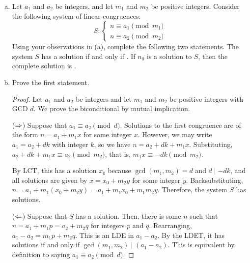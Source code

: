 \begin{enumerate}[(a)]
  \item Let $a_1$ and $a_2$ be integers, and let $m_1$ and $m_2$ be positive integers.
        Consider the following system of linear congruences:
        \begin{equation*}
          S : \begin{cases}
            n \equiv a_1 \pmod{m_1} \\
            n \equiv a_2 \pmod{m_2}
          \end{cases}
        \end{equation*}
        Using your observations in (a), complete the following two statements.
        The system $S$ has a solution if and only if
        .
        If $n_0$ is a solution to $S$, then the complete solution is
        .

  \item Prove the first statement.
        \begin{proof}
          Let $a_1$ and $a_2$ be integers and let $m_1$ and $m_2$ be positive integers with GCD $d$.
          We prove the biconditional by mutual implication.

          ($\Rightarrow$) Suppose that $a_1 \equiv a_2 \pmod{d}$.
          Solutions to the first congruence are of the form $n = a_1 + m_1x$ for some integer $x$.
          However, we may write $a_1 = a_2 + dk$ with integer $k$, so we have $n = a_2 + dk + m_1x$.
          Substituting, $a_2 + dk + m_1x \equiv a_2 \pmod{m_2}$,
          that is, $m_1x \equiv -dk \pmod{m_2}$.

          By LCT, this has a solution $x_0$ because $\gcd(m_1,m_2)=d$ and $d \mid -dk$,
          and all solutions are given by $x = x_0 + m_2y$ for some integer $y$.
          Backsubstituting, $n = a_1 + m_1(x_0+m_2y) = a_1 + m_1x_0 + m_1m_2y$.
          Therefore, the system $S$ has solutions.

          ($\Leftarrow$) Suppose that $S$ has a solution.
          Then, there is some $n$ such that $n = a_1 + m_1p = a_2 + m_2q$ for integers $p$ and $q$.
          Rearranging, $a_1 - a_2 = m_1p + m_2q$.
          This is an LDE in $a_1-a_2$.
          By the LDET, it has solutions if and only if $\gcd(m_1,m_2) \mid (a_1 - a_2)$.
          This is equivalent by definition to saying $a_1 \equiv a_2 \pmod d$.
        \end{proof}
\end{enumerate}


